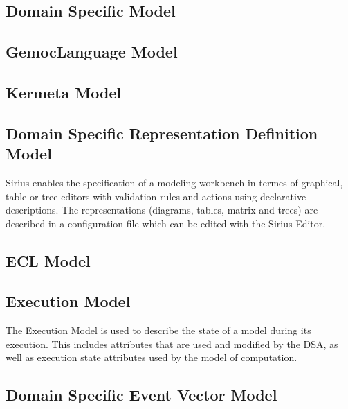 \documentclass{gemoc} %
\begin{document}

\subsection{Domain Specific Model}


\subsection{GemocLanguage Model}


\subsection{Kermeta Model}


\subsection{Domain Specific  Representation Definition Model}
Sirius enables the specification of a modeling workbench in termes of graphical, table or tree editors with validation rules and actions using declarative descriptions. The representations (diagrams, tables, matrix and trees) are described in a configuration file which can be edited with the Sirius Editor.

\subsection{ECL Model}


\subsection{Execution Model}
The Execution Model is used to describe the state of a model during its execution. This includes attributes that are used and modified by the DSA, as well as execution state attributes used by the model of computation.

\subsection{Domain Specific Event Vector Model}
\end{document}
